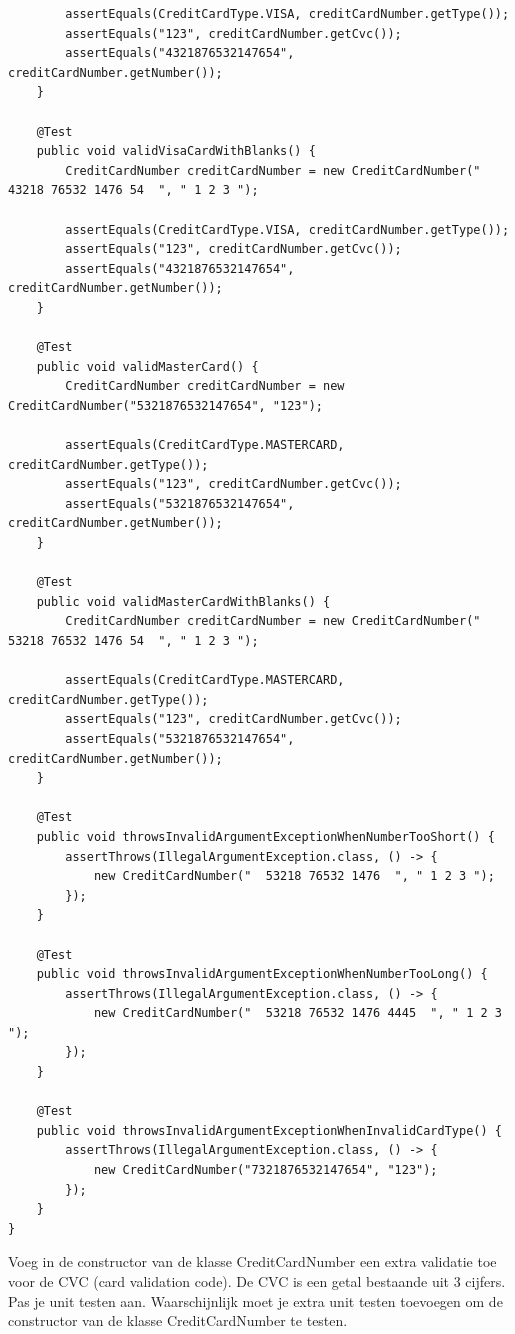 \begin{itemize}
{\begin{lstlisting}
		assertEquals(CreditCardType.VISA, creditCardNumber.getType());
		assertEquals("123", creditCardNumber.getCvc());
		assertEquals("4321876532147654", creditCardNumber.getNumber());
	}

	@Test
	public void validVisaCardWithBlanks() {
		CreditCardNumber creditCardNumber = new CreditCardNumber("  43218 76532 1476 54  ", " 1 2 3 ");

		assertEquals(CreditCardType.VISA, creditCardNumber.getType());
		assertEquals("123", creditCardNumber.getCvc());
		assertEquals("4321876532147654", creditCardNumber.getNumber());
	}

	@Test
	public void validMasterCard() {
		CreditCardNumber creditCardNumber = new CreditCardNumber("5321876532147654", "123");

		assertEquals(CreditCardType.MASTERCARD, creditCardNumber.getType());
		assertEquals("123", creditCardNumber.getCvc());
		assertEquals("5321876532147654", creditCardNumber.getNumber());
	}

	@Test
	public void validMasterCardWithBlanks() {
		CreditCardNumber creditCardNumber = new CreditCardNumber("  53218 76532 1476 54  ", " 1 2 3 ");

		assertEquals(CreditCardType.MASTERCARD, creditCardNumber.getType());
		assertEquals("123", creditCardNumber.getCvc());
		assertEquals("5321876532147654", creditCardNumber.getNumber());
	}

	@Test
	public void throwsInvalidArgumentExceptionWhenNumberTooShort() {
		assertThrows(IllegalArgumentException.class, () -> {
			new CreditCardNumber("  53218 76532 1476  ", " 1 2 3 ");
		});
	}

	@Test
	public void throwsInvalidArgumentExceptionWhenNumberTooLong() {
		assertThrows(IllegalArgumentException.class, () -> {
			new CreditCardNumber("  53218 76532 1476 4445  ", " 1 2 3 ");
		});
	}

	@Test
	public void throwsInvalidArgumentExceptionWhenInvalidCardType() {
		assertThrows(IllegalArgumentException.class, () -> {
			new CreditCardNumber("7321876532147654", "123");
		});
	}
}
\end{lstlisting}

\begin{oefening}
Voeg in de constructor van de klasse CreditCardNumber een extra validatie toe voor de CVC (card validation code). De CVC is een getal bestaande uit 3 cijfers.
Pas je unit testen aan. Waarschijnlijk moet je extra unit testen toevoegen om de constructor van de klasse CreditCardNumber te testen.
\end{oefening}


}
\end{itemize}
